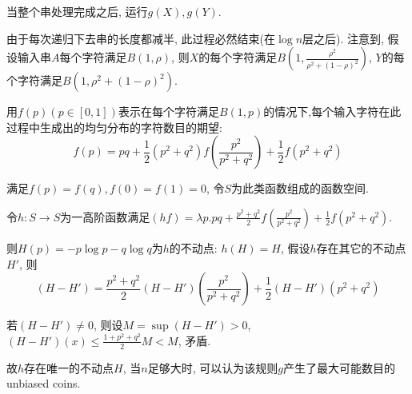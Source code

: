 \documentclass[paper=a4, fontsize=11pt]{scrartcl} %
\numberwithin{equation}{section} %
\numberwithin{figure}{section} %
\numberwithin{table}{section} %
\begin{document}
\begin{enumerate}[(a)]
	当整个串处理完成之后, 运行$g(X), g(Y)$.

	由于每次递归下去串的长度都减半, 此过程必然结束(在$\log n$层之后).
	注意到, 假设输入串$A$每个字符满足$B(1, \rho)$, 则$X$的每个字符满足$B(1, \frac{\rho^2}{\rho^2 + (1-\rho)^2})$, $Y$的每个字符满足$B(1, \rho^2 + (1 - \rho)^2)$. 

	用$f(p)(p\in [0, 1])$表示在每个字符满足$B(1,p)$的情况下,每个输入字符在此过程中生成出的均匀分布的字符数目的期望:
	$$f(p) = pq + \frac{1}{2}\left(p^2 + q^2\right)f\left(\frac{p^2}{p^2 + q^2}\right) + \frac{1}{2}f\left(p^2 + q^2\right)$$

	满足$f(p) = f(q), f(0) = f(1) = 0$, 令$S$为此类函数组成的函数空间.

	令$h:S\rightarrow S$为一高阶函数满足$(hf) = \lambda p. pq + \frac{p^2 + q^2}{2}f\left(\frac{p^2}{p^2 + q^2}\right) + \frac{1}{2}f\left(p^2 + q^2\right)$.

	则$H(p) = -p \log p - q \log q$为$h$的不动点: $h(H) = H$, 假设$h$存在其它的不动点$H'$, 则
	$$(H - H') = \frac{p^2 + q^2}{2}(H-H')\left(\frac{p^2}{p^2+q^2}\right) + \frac{1}{2}(H-H')\left(p^2 + q^2\right)$$

	若$(H - H') \not= 0$, 则设$M = \sup(H - H') > 0 $, $(H - H')(x) \leq \frac{1+p^2 + q^2}{2} M < M$, 矛盾.

	故$h$存在唯一的不动点$H$, 当$n$足够大时, 可以认为该规则$g$产生了最大可能数目的unbiased coins.

\end{enumerate}
\end{document}
